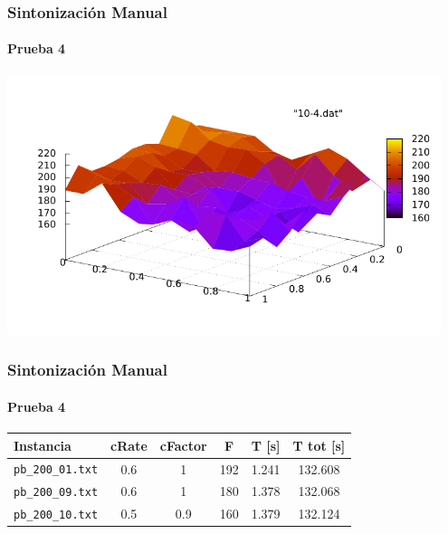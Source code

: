 \frame
{
\frametitle{Sintonización Manual}
\framesubtitle{Prueba 4}

\begin{center}
    \includegraphics[width=0.95\textwidth]{../doc/img/10-4.pdf}
\end{center}
}
\frame
{
\frametitle{Sintonización Manual}
\framesubtitle{Prueba 4}
\begin{center}
\begin{tabular}{|l|c|c|c|c|c|}
    \hline
    \textbf{Instancia} & \textbf{cRate} & \textbf{cFactor} &\textbf{F} & \textbf{T [s]} & \textbf{T tot [s]}\\\hline
    \texttt{pb\_200\_01.txt} & 0.6 & 1   & 192 & 1.241 & 132.608 \\\hline
    \texttt{pb\_200\_09.txt} & 0.6 & 1   & 180 & 1.378 & 132.068 \\\hline
    \texttt{pb\_200\_10.txt} & 0.5 & 0.9 & 160 & 1.379 & 132.124 \\\hline
\end{tabular}
\end{center}
}

